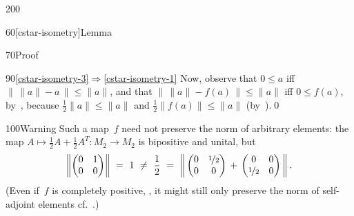 \begin{parsec}{200}
\begin{point}{60}[cstar-isometry]{Lemma}
\begin{point}{70}{Proof}
\begin{point}{90}{\ref{cstar-isometry-3}$\Longrightarrow$\ref{cstar-isometry-1}}
Now,
observe that
$0\leq a$
iff
$ \|\,\|a\|-a\,\|\leq \|a\|$,
and that
$\|\,\|a\|-f(a)\,\|\leq \|a\|$ 
iff $0\leq f(a)$,
by~,
because $\frac{1}{2}\|a\|\leq \|a\|$
and $\frac{1}{2}\|f(a)\|\leq  \|a\|$
(by~).\qed
\end{point}
\end{point}
\begin{point}{100}{Warning}%
Such a map~$f$ need not preserve the norm of arbitrary elements:
the map $A\mapsto \frac{1}{2}A+\frac{1}{2}A^T\colon M_2\to M_2$
is bipositive and unital,
but
\begin{equation*}
\left\|\left(\begin{matrix}0&1\\0&0\end{matrix}
\right)\right\|
\ = \ 1 \ \neq \ \frac{1}{2}\ = \ 
\left\|\,\left(\begin{matrix}0 & \nicefrac{1}{2} \\ 0 & 0
\end{matrix}\right)
\,+\,\left(\begin{matrix}0 & 0\\ \nicefrac{1}{2} & 0
\end{matrix}\right)\,\right\|.
\end{equation*}
(Even if~$f$ is completely positive, ,
it might still only preserve the norm of self-adjoint elements
cf.~.)
\end{point}
\end{point}
\end{parsec}
